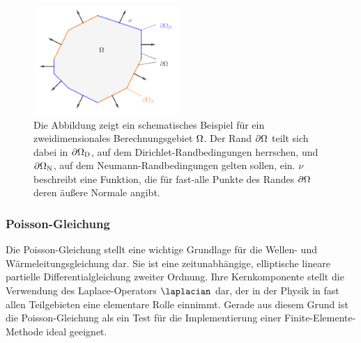 \documentclass[crop=false]{standalone}
\begin{document}
        \begin{figure}[t]
          \center
          \includegraphics[width=0.5\textwidth]{images/domain.pdf}
          \caption[Beispiel eines zweidimensionalen Berechnungsgebietes]{%
            Die Abbildung zeigt ein schematisches Beispiel für ein zweidimensionales Berechnungsgebiet $\Omega$.
            Der Rand $\partial\Omega$ teilt sich dabei in $\partial\Omega_\mathrm{D}$, auf dem Dirichlet-Randbedingungen herrschen, und $\partial\Omega_\mathrm{N}$, auf dem Neumann-Randbedingungen gelten sollen, ein.
            $ν$ beschreibt eine Funktion, die für fast-alle Punkte des Randes $\partial\Omega$ deren äußere Normale angibt.
          }
          \label{fig:domain}
        \end{figure}

      \subsubsection{Poisson-Gleichung} %
      \label{ssub:poisson_gleichung}
        Die Poisson-Gleichung stellt eine wichtige Grundlage für die Wellen- und Wärmeleitungsgleichung dar.
        Sie ist eine zeitunabhängige, elliptische lineare partielle Differentialgleichung zweiter Ordnung.
        Ihre Kernkomponente stellt die Verwendung des Laplace-Operators $\laplacian$ dar, der in der Physik in fast allen Teilgebieten eine elementare Rolle einnimmt.
        Gerade aus diesem Grund ist die Poisson-Gleichung als ein Test für die Implementierung einer Finite-Elemente-Methode ideal geeignet.
\end{document}
